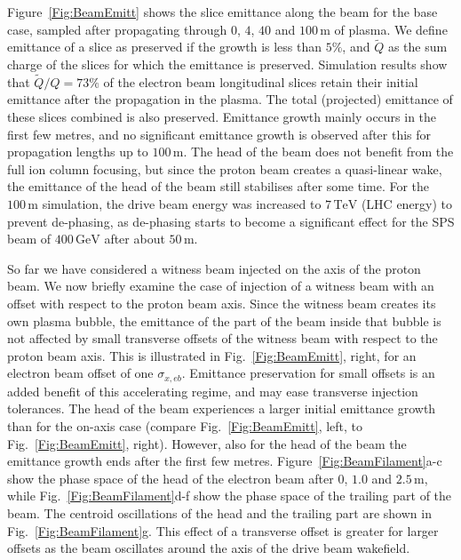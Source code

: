 \documentclass[aps,prstab,reprint,amsmath,amssymb,groupedaddress]{revtex4-1}
\newcommand{\unit}[1]{\,\mathrm{#1}}
\begin{document}
Figure~\ref{Fig:BeamEmitt} shows the slice emittance along the beam for the base case, sampled after propagating through $0$, $4$, $40$ and $100\unit{m}$ of plasma. We define emittance of a slice as preserved if the growth is less than $5\%$, and $\widetilde{Q}$ as the sum charge of the slices for which the emittance is preserved. Simulation results show that $\widetilde{Q}/Q = 73\%$ of the electron beam longitudinal slices retain their initial emittance after the propagation in the plasma. The total (projected) emittance of these slices combined is also preserved. Emittance growth mainly occurs in the first few metres, and no significant emittance growth is observed after this for propagation lengths up to $100\unit{m}$. The head of the beam does not benefit from the full ion column focusing, but since the proton beam creates a quasi-linear wake, the emittance of the head of the beam still stabilises after some time. For the $100\unit{m}$ simulation, the drive beam energy was increased to $7\unit{TeV}$ (LHC energy) to prevent de-phasing, as de-phasing starts to become a significant effect for the SPS beam of $400\unit{GeV}$ after about $50\unit{m}$.

So far we have considered a witness beam injected on the axis of the proton beam. We now briefly examine the case of injection of a witness beam with an offset with respect to the proton beam axis. Since the witness beam creates its own plasma bubble, the emittance of the part of the beam inside that bubble is not affected by small transverse offsets of the witness beam with respect to the proton beam axis. This is illustrated in Fig.~\ref{Fig:BeamEmitt}, right, for an electron beam offset of one $\sigma_{x,eb}$. Emittance preservation for small offsets is an added benefit of this accelerating regime, and may ease transverse injection tolerances. The head of the beam experiences a larger initial emittance growth than for the on-axis case (compare Fig.~\ref{Fig:BeamEmitt}, left, to Fig.~\ref{Fig:BeamEmitt}, right). However, also for the head of the beam the emittance growth ends after the first few metres. Figure~\ref{Fig:BeamFilament}a-c show the phase space of the head of the electron beam after $0$, $1.0$ and $2.5\unit{m}$, while Fig.~\ref{Fig:BeamFilament}d-f show the phase space of the trailing part of the beam. The centroid oscillations of the head and the trailing part are shown in Fig.~\ref{Fig:BeamFilament}g. This effect of a transverse offset is greater for larger offsets as the beam oscillates around the axis of the drive beam wakefield.
\end{document}
